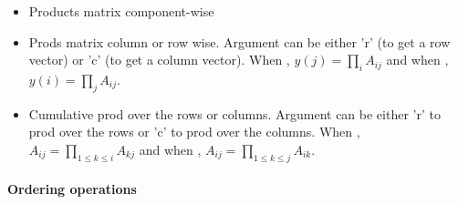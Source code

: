 \begin{itemize}
\item {}
  \sshortdescribe Products matrix component-wise

\item {}
  \sshortdescribe Prods matrix column or row wise. Argument  can be
  either 'r' (to get a row vector) or 'c' (to get a column vector). When
  , $y(j) = \prod_i A_{ij}$ and when , $y(i) = \prod_j
  A_{ij}$.

\item {} 
  \sshortdescribe Cumulative prod over the rows or columns. Argument 
  can be either 'r' to prod over the rows or 'c' to prod over the columns. When
  , $A_{ij} = \prod_{1 \le k \le i} A_{kj}$ and when , 
  $A_{ij} = \prod_{1 \le k \le j} A_{ik}$.
\end{itemize}

\paragraph{Ordering operations}

